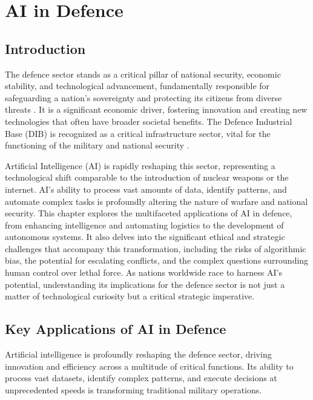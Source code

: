 \chapter{AI in Defence}
\label{cha:ai_in_defence}

\section{Introduction}

The defence sector stands as a critical pillar of national security, economic stability, and technological advancement, fundamentally responsible for safeguarding a nation's sovereignty and protecting its citizens from diverse threats \cite{NasemCelik_Defence, ResearchGate_Defence}. It is a significant economic driver, fostering innovation and creating new technologies that often have broader societal benefits. The Defence Industrial Base (DIB) is recognized as a critical infrastructure sector, vital for the functioning of the military and national security \cite{DHS_DIB, APUS_DIB}.

Artificial Intelligence (AI) is rapidly reshaping this sector, representing a technological shift comparable to the introduction of nuclear weapons or the internet. AI's ability to process vast amounts of data, identify patterns, and automate complex tasks is profoundly altering the nature of warfare and national security. This chapter explores the multifaceted applications of AI in defence, from enhancing intelligence and automating logistics to the development of autonomous systems. It also delves into the significant ethical and strategic challenges that accompany this transformation, including the risks of algorithmic bias, the potential for escalating conflicts, and the complex questions surrounding human control over lethal force. As nations worldwide race to harness AI's potential, understanding its implications for the defence sector is not just a matter of technological curiosity but a critical strategic imperative.

\section{Key Applications of AI in Defence}

Artificial intelligence is profoundly reshaping the defence sector, driving innovation and efficiency across a multitude of critical functions. Its ability to process vast datasets, identify complex patterns, and execute decisions at unprecedented speeds is transforming traditional military operations.

